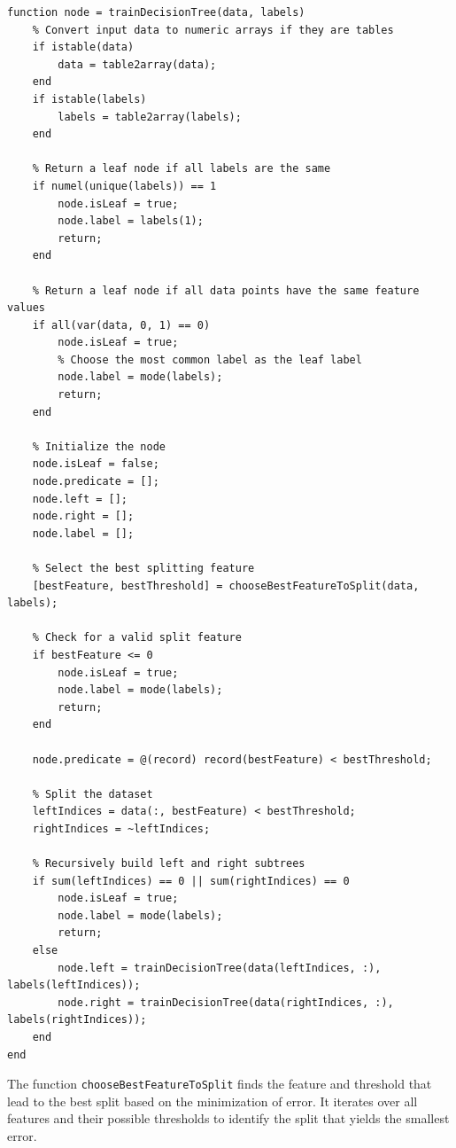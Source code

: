 \documentclass[12pt, onecolumn]{article}
\begin{document}
\begin{verbatim}
function node = trainDecisionTree(data, labels)
    % Convert input data to numeric arrays if they are tables
    if istable(data)
        data = table2array(data);
    end
    if istable(labels)
        labels = table2array(labels);
    end

    % Return a leaf node if all labels are the same
    if numel(unique(labels)) == 1
        node.isLeaf = true;
        node.label = labels(1);
        return;
    end

    % Return a leaf node if all data points have the same feature values
    if all(var(data, 0, 1) == 0)
        node.isLeaf = true;
        % Choose the most common label as the leaf label
        node.label = mode(labels);
        return;
    end

    % Initialize the node
    node.isLeaf = false;
    node.predicate = [];
    node.left = [];
    node.right = [];
    node.label = [];

    % Select the best splitting feature
    [bestFeature, bestThreshold] = chooseBestFeatureToSplit(data, labels);

    % Check for a valid split feature
    if bestFeature <= 0
        node.isLeaf = true;
        node.label = mode(labels);
        return;
    end

    node.predicate = @(record) record(bestFeature) < bestThreshold;

    % Split the dataset
    leftIndices = data(:, bestFeature) < bestThreshold;
    rightIndices = ~leftIndices;

    % Recursively build left and right subtrees
    if sum(leftIndices) == 0 || sum(rightIndices) == 0
        node.isLeaf = true;
        node.label = mode(labels);
        return;
    else
        node.left = trainDecisionTree(data(leftIndices, :), labels(leftIndices));
        node.right = trainDecisionTree(data(rightIndices, :), labels(rightIndices));
    end
end
\end{verbatim}


The function \texttt{chooseBestFeatureToSplit} finds the feature and threshold that lead to the best split based on the minimization of error. It iterates over all features and their possible thresholds to identify the split that yields the smallest error.
\end{document}
